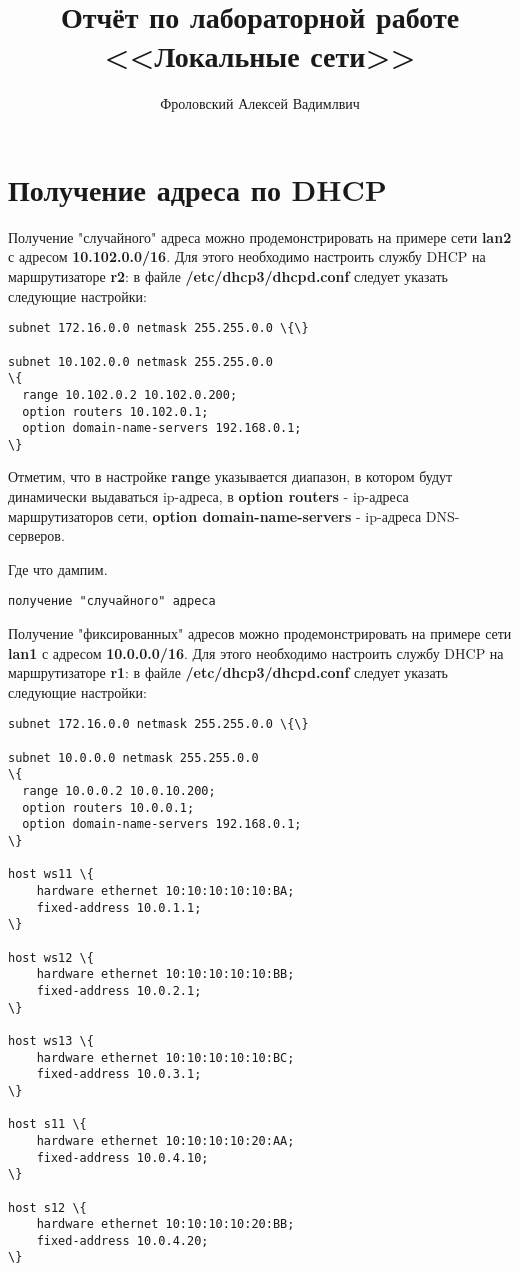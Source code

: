 \documentclass[a4paper,12pt]{article}
\title{Отчёт по лабораторной работе \\ <<Локальные сети>>}
\author{Фроловский Алексей Вадимлвич}
\begin{document}
\maketitle

\tableofcontents


\section{Получение адреса по DHCP}

Получение "случайного" адреса можно продемонстрировать на примере
сети \textbf{lan2} с адресом \textbf{10.102.0.0/16}. Для этого
необходимо настроить службу DHCP на маршрутизаторе \textbf{r2}:
в файле \textbf{/etc/dhcp3/dhcpd.conf} следует указать следующие
настройки:
\begin{Verbatim}
subnet 172.16.0.0 netmask 255.255.0.0 \{\}

subnet 10.102.0.0 netmask 255.255.0.0
\{
  range 10.102.0.2 10.102.0.200;
  option routers 10.102.0.1;
  option domain-name-servers 192.168.0.1;
\}
\end{Verbatim}

Отметим, что в настройке \textbf{range} указывается диапазон,
в котором будут динамически выдаваться ip-адреса, в
\textbf{option routers} - ip-адреса маршрутизаторов сети,
\textbf{option domain-name-servers} - ip-адреса DNS-серверов.

Где что дампим.

\begin{Verbatim}
получение "случайного" адреса
\end{Verbatim}

Получение "фиксированных" адресов можно продемонстрировать на
примере сети \textbf{lan1} с адресом \textbf{10.0.0.0/16}. Для
этого необходимо настроить службу DHCP на маршрутизаторе
\textbf{r1}: в файле \textbf{/etc/dhcp3/dhcpd.conf} следует
указать следующие настройки:
\begin{Verbatim}
subnet 172.16.0.0 netmask 255.255.0.0 \{\}

subnet 10.0.0.0 netmask 255.255.0.0
\{
  range 10.0.0.2 10.0.10.200;
  option routers 10.0.0.1;
  option domain-name-servers 192.168.0.1;
\}

host ws11 \{
    hardware ethernet 10:10:10:10:10:BA;
    fixed-address 10.0.1.1;
\}

host ws12 \{
    hardware ethernet 10:10:10:10:10:BB;
    fixed-address 10.0.2.1;
\}

host ws13 \{
    hardware ethernet 10:10:10:10:10:BC;
    fixed-address 10.0.3.1;
\}

host s11 \{
    hardware ethernet 10:10:10:10:20:AA;
    fixed-address 10.0.4.10;
\}

host s12 \{
    hardware ethernet 10:10:10:10:20:BB;
    fixed-address 10.0.4.20;
\}
\end{Verbatim}
\end{document}
